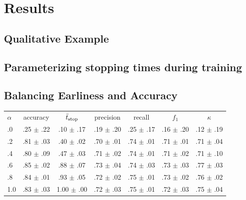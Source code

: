 \documentclass[a0]{tumposter}
\begin{document}
\begin{minipage}[t]{.32\textwidth}
	\section{Results}
	
	
	\figearlyreward

	\subsection{Qualitative Example}
	
	
	
	
	\subsection{Parameterizing stopping times during training}
	
	
	
	
	\subsection{Balancing Earliness and Accuracy}
	\begin{table}
		
		\scriptsize
		\hspace{0em}\begin{tabular}{lcccccc}
			\toprule\small
			\textbf{$\alpha$} & accuracy & $\bar{t}_\text{stop}$  & precision & recall & $f_1$ & $\kappa$ \\
			\cmidrule(lr){0-0}\cmidrule(lr){1-1}\cmidrule(lr){2-2}\cmidrule(lr){3-3}\cmidrule(lr){4-4}\cmidrule(lr){5-5}\cmidrule(lr){6-6}\cmidrule(lr){7-7}
			.0 & .25 $\pm$ .22 & .10 $\pm$ .17 & .19 $\pm$ .20 & .25 $\pm$ .17 & .16 $\pm$ .20 & .12 $\pm$ .19 \\
			.2 & .81 $\pm$ .03 & .40 $\pm$ .02 & .70 $\pm$ .01 & .74 $\pm$ .01 & .71 $\pm$ .01 & .71 $\pm$ .04 \\
			.4 & .80 $\pm$ .09 & .47 $\pm$ .03 & .71 $\pm$ .02 & .74 $\pm$ .01 & .71 $\pm$ .02 & .71 $\pm$ .10 \\
			.6 & .85 $\pm$ .02 & .88 $\pm$ .07 & .73 $\pm$ .04 & .74 $\pm$ .03 & .73 $\pm$ .03 & .77 $\pm$ .03 \\
			.8 & .84 $\pm$ .01 & .93 $\pm$ .05 & .72 $\pm$ .02 & .75 $\pm$ .01 & .73 $\pm$ .02 & .76 $\pm$ .02 \\
			1.0 & .83 $\pm$ .03 & 1.00 $\pm$ .00 & .72 $\pm$ .03 & .75 $\pm$ .01 & .72 $\pm$ .03 & .75 $\pm$ .04 \\
			\bottomrule
		\end{tabular}
		

\end{table}
\end{minipage}
\end{document}
